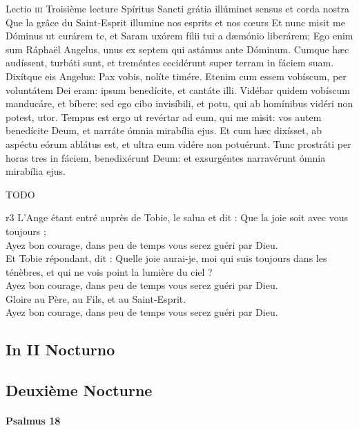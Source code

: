\documentclass[twoside]{article}
\begin{document}
\begin{paracol}[1]{2}
\lectioresponsorium
	{Lectio \textsc{iii}}
	{Troisième lecture}
	{Spíritus Sancti grátia illúminet sensus et corda nostra}
	{Que la grâce du Saint-Esprit illumine nos esprits et nos cœurs}
	{
		Et nunc misit me Dóminus ut curárem te, et Saram uxórem fílii tui a dæmónio liberárem;
		Ego enim sum Ráphaël Angelus, unus ex septem qui astámus ante Dóminum.
		Cumque hæc audíssent, turbáti sunt, et treméntes cecidérunt super terram in fáciem suam.
		Dixítque eis Angelus: Pax vobis, nolíte timére.
		Etenim cum essem vobíscum, per voluntátem Dei eram: ipsum benedícite, et cantáte illi.
		Vidébar quidem vobíscum manducáre, et bíbere: sed ego cibo invisíbili, et potu, qui ab homínibus vidéri non potest, utor.
		Tempus est ergo ut revértar ad eum, qui me misit: vos autem benedícite Deum, et narráte ómnia mirabília ejus.
		Et cum hæc dixísset, ab aspéctu eórum ablátus est, et ultra eum vidére non potuérunt.
		Tunc prostráti per horas tres in fáciem, benedixérunt Deum: et exsurgéntes narravérunt ómnia mirabília ejus.
	}
	{	 TODO 
	
	}
	{r3}
	{\rr L’Ange étant entré auprès de Tobie, le salua et dit : Que la joie soit avec vous toujours ;\\
	\GreSpecial{*} Ayez bon courage, dans peu de temps vous serez guéri par Dieu.\\
	\vv Et Tobie répondant, dit : Quelle joie aurai-je, moi qui suis toujours dans les ténèbres, et qui ne vois point la lumière du ciel ?\\
	\GreSpecial{*} Ayez bon courage, dans peu de temps vous serez guéri par Dieu.\\
	\vv Gloire au Père, au Fils, et au Saint-Esprit.\\
	\GreSpecial{*} Ayez bon courage, dans peu de temps vous serez guéri par Dieu.}

\subsection{In II Nocturno}

\switchcolumn

\subsection{Deuxième Nocturne}

\switchcolumn*

\paragraph{Psalmus 18}


\end{paracol}
\end{document}

